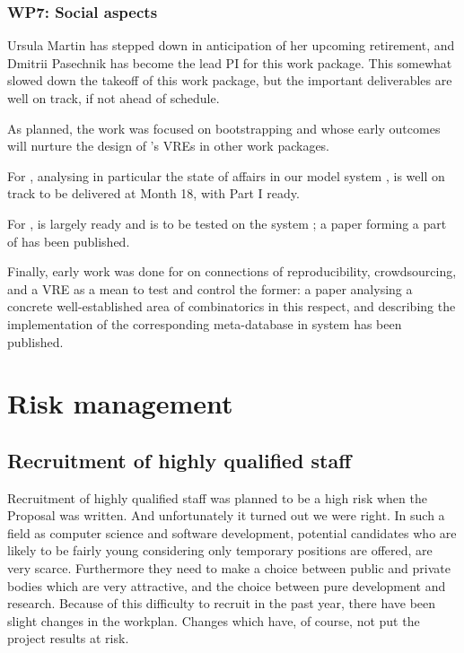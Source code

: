 \documentclass{deliverablereport}
\begin{document}
\subsubsection{WP7: Social aspects}

Ursula Martin has stepped down in anticipation of her upcoming
retirement, and Dmitrii Pasechnik has become the lead PI for this work
package.  This somewhat slowed down the takeoff of this work package,
but the important deliverables are well on track, if not ahead of
schedule.

As planned, the work was focused on bootstrapping
 and
 whose early
outcomes will nurture the design of \ODK's VREs in other work
packages.

For ,
 analysing in
particular the state of affairs in our model system \Sage, is well on
track to be delivered at Month 18, with Part I ready.

For ,
 is largely ready and is to
be tested on the system \Sage; a paper
\cite{Pavlou:2016:MCI:2936924.2936934} forming a part of
 has been published.

Finally, early work was done for
 on connections of
reproducibility, crowdsourcing, and a VRE as a mean to test and
control the former: a paper \cite{2016arXiv160100181C} analysing a
concrete well-established area of combinatorics in this respect, and
describing the implementation of the corresponding meta-database in
\Sage system has been published.

\section{Risk management}
\subsection{Recruitment of highly qualified staff}
Recruitment of highly qualified staff was planned to be a high risk
when the Proposal was written. And unfortunately it turned out we were
right. In such a field as computer science and software development,
potential candidates who are likely to be fairly young considering
only temporary positions are offered, are very scarce. Furthermore
they need to make a choice between public and private bodies which are
very attractive, and the choice between pure development and research.
Because of this difficulty to recruit in the past year, there have
been slight changes in the workplan. Changes which have, of course,
not put the project results at risk.
\end{document}
